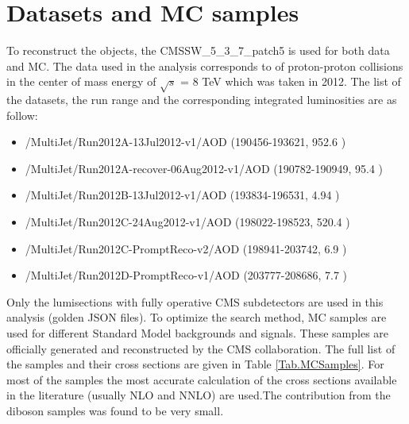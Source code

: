 \section{Datasets and MC samples}
\label{sect:dataMC}
To reconstruct the objects, the CMSSW\_5\_3\_7\_patch5 is used for both data and MC.
The data used in the analysis corresponds to \IL of proton-proton collisions in the center of mass energy of $\sqrt{s}$ = 8 TeV 
which was taken in 2012. The list of the datasets, the run range and the corresponding integrated luminosities are as follow:
\begin{itemize}
\item /MultiJet/Run2012A-13Jul2012-v1/AOD (190456-193621, 952.6 \invpb) 
\item /MultiJet/Run2012A-recover-06Aug2012-v1/AOD (190782-190949, 95.4 \invpb) 
\item /MultiJet/Run2012B-13Jul2012-v1/AOD (193834-196531, 4.94 \invfb)
\item /MultiJet/Run2012C-24Aug2012-v1/AOD (198022-198523, 520.4 \invpb)
\item /MultiJet/Run2012C-PromptReco-v2/AOD (198941-203742, 6.9 \invfb)
\item /MultiJet/Run2012D-PromptReco-v1/AOD (203777-208686, 7.7 \invfb)
\end{itemize}

Only the lumisections with fully operative CMS subdetectors are used in this analysis (golden JSON files). To optimize the search method, MC 
samples are used for different Standard Model backgrounds and signals. These samples are officially generated and reconstructed by the CMS
collaboration. The full list of the samples and their cross sections are given in Table \ref{Tab.MCSamples}. For most of the samples the most 
accurate calculation of the cross sections available in the literature (usually NLO and NNLO) are used.The contribution from the diboson  samples was found to be very small.

